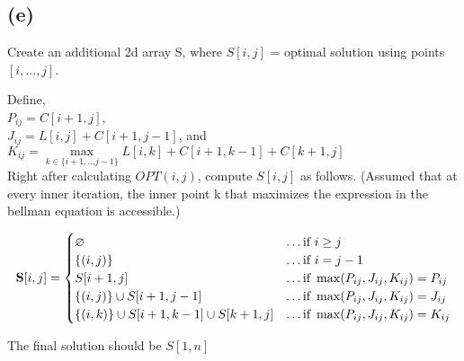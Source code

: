 \subsection*{(e)}


Create an additional 2d array S, where $S[i,j]$ = optimal solution using points $[i, ... ,j]$.

Define, \\
$P_{ij} = C[i + 1, j]$,\\ 
$J_{ij} = L[i,j] + C[i+1, j-1]$, and \\
$K_{ij} =  \max\limits_{k \in \{i + 1, ... j - 1\}} L[i,k] + C[i + 1, k - 1] + C[k + 1, j]$\\

Right after calculating $OPT(i,j)$, compute $S[i,j]$ as follows. (Assumed that at every inner iteration, the inner point k that maximizes the expression in the bellman equation is accessible.)

\begin{equation}
    \begin{split}
        \textbf{S}[i, j] = \begin{cases}
                        \varnothing & \dots \text{if } i \geq j\\
                        \{(i,j)\} & \dots \text{if } i = j - 1\\
                        S[i+1,j] & \dots \text{if } \max (P_{ij}, J_{ij}, K_{ij}) = P_{ij} \\
                        \{(i,j)\} \cup S[i+1, j-1] & \dots \text{if } \max (P_{ij}, J_{ij}, K_{ij}) = J_{ij} \\
                        \{(i,k)\} \cup S[i+1, k-1] \cup S[k+1, j] & \dots \text{if } \max (P_{ij}, J_{ij}, K_{ij}) = K_{ij}
                    \end{cases}
    \end{split}
\end{equation}


The final solution should be $S[1, n]$